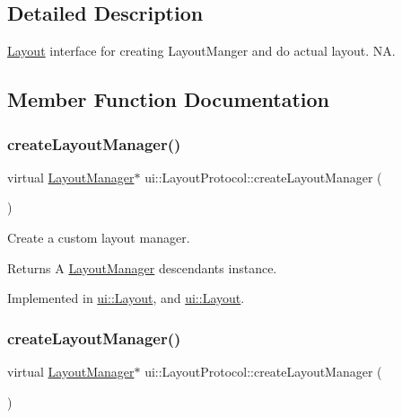 \subsection{Detailed Description}
\hyperlink{classui_1_1Layout}{Layout} interface for creating Layout\+Manger and do actual layout.  NA. 

\subsection{Member Function Documentation}
\mbox{\label{classui_1_1LayoutProtocol_a4ff58063d53e9e9b9684a1e2e6cc485a}} 
\subsubsection{\texorpdfstring{create\+Layout\+Manager()}{createLayoutManager()}\hspace{0.1cm}{\footnotesize\ttfamily [1/2]}}
{\footnotesize\ttfamily virtual \hyperlink{classui_1_1LayoutManager}{Layout\+Manager}$\ast$ ui\+::\+Layout\+Protocol\+::create\+Layout\+Manager (\begin{DoxyParamCaption}{ }\end{DoxyParamCaption})\hspace{0.3cm}{\ttfamily [pure virtual]}}



Create a custom layout manager. 

\begin{DoxyReturn}{Returns}
A \hyperlink{classui_1_1LayoutManager}{Layout\+Manager} descendants instance. 
\end{DoxyReturn}


Implemented in \hyperlink{classui_1_1Layout_ade857c1e220dc8b5844966e2c37b7a1f}{ui\+::\+Layout}, and \hyperlink{classui_1_1Layout_a577a2868212962f2da8522f3fc5b81c7}{ui\+::\+Layout}.

\mbox{\label{classui_1_1LayoutProtocol_a4ff58063d53e9e9b9684a1e2e6cc485a}} 
\subsubsection{\texorpdfstring{create\+Layout\+Manager()}{createLayoutManager()}\hspace{0.1cm}{\footnotesize\ttfamily [2/2]}}
{\footnotesize\ttfamily virtual \hyperlink{classui_1_1LayoutManager}{Layout\+Manager}$\ast$ ui\+::\+Layout\+Protocol\+::create\+Layout\+Manager (\begin{DoxyParamCaption}{ }\end{DoxyParamCaption})\hspace{0.3cm}{\ttfamily [pure virtual]}}



